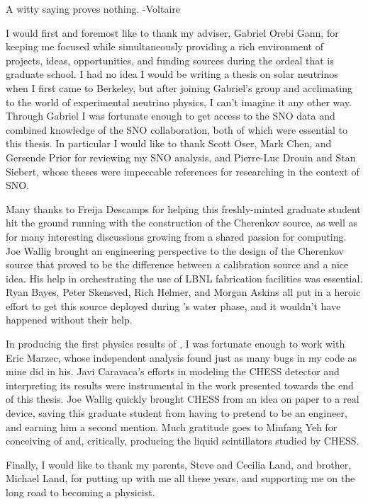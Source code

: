 \documentclass[12pt,letterpaper,oldfontcommands]{ucbthesis}
\begin{document}
\begin{frontmatter}

\begin{dedication}
\null\vfil
\begin{center}
A witty saying proves nothing. -Voltaire
\end{center}
\vfil\null
\end{dedication}

\tableofcontents
\clearpage
\listoffigures
\clearpage
\listoftables

\begin{acknowledgements}

I would first and foremost like to thank my adviser, Gabriel Orebi Gann, for keeping me focused while simultaneously providing a rich environment of projects, ideas, opportunities, and funding sources during the ordeal that is graduate school. 
I had no idea I would be writing a thesis on solar neutrinos when I first came to Berkeley, but after joining Gabriel's group and acclimating to the world of experimental neutrino physics, I can't imagine it any other way.
Through Gabriel I was fortunate enough to get access to the SNO data and combined knowledge of the SNO collaboration, both of which were essential to this thesis.
In particular I would like to thank Scott Oser, Mark Chen, and Gersende Prior for reviewing my SNO analysis, and Pierre-Luc Drouin and Stan Siebert, whose theses were impeccable references for researching in the context of SNO.

Many thanks to Freija Descamps for helping this freshly-minted graduate student hit the ground running with the construction of the Cherenkov source, as well as for many interesting discussions growing from a shared passion for computing.
Joe Wallig brought an engineering perspective to the design of the Cherenkov source that proved to be the difference between a calibration source and a nice idea.
His help in orchestrating the use of LBNL fabrication facilities was essential.
Ryan Bayes, Peter Skensved, Rich Helmer, and Morgan Askins all put in a heroic effort to get this source deployed during {\snop}'s water phase, and it wouldn't have happened without their help.

In producing the first physics results of {\snop}, I was fortunate enough to work with Eric Marzec, whose independent analysis found just as many bugs in my code as mine did in his.
Javi Caravaca's efforts in modeling the CHESS detector and interpreting its results were instrumental in the work presented towards the end of this thesis.
Joe Wallig quickly brought CHESS from an idea on paper to a real device, saving this graduate student from having to pretend to be an engineer, and earning him a second mention.
Much gratitude goes to Minfang Yeh for conceiving of and, critically, producing the liquid scintillators studied by CHESS. 

Finally, I would like to thank my parents, Steve and Cecilia Land, and brother, Michael Land, for putting up with me all these years, and supporting me on the long road to becoming a physicist.

\end{acknowledgements}

\end{frontmatter}
\end{document}
